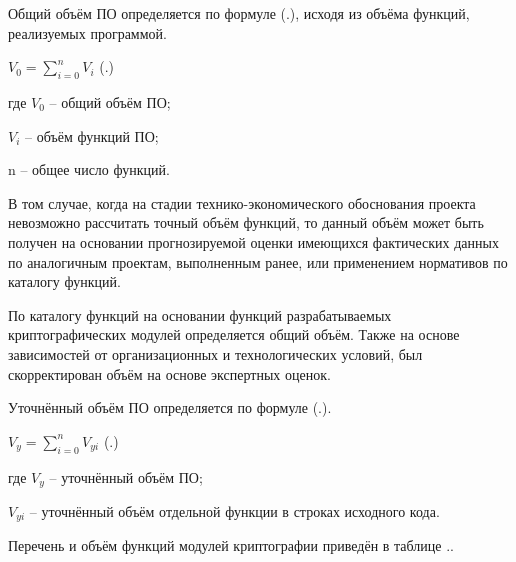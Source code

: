 \subtitlespace

{\gostFont
	
	\par \redline Общий объём ПО определяется по формуле (\thechaptercntr .\theformulacntr), исходя из объёма функций, реализуемых программой. 
	
	\formulaspace \par \redline 
	$V_0=\sum_{i=0}^{n}V_i$ 
	\hfill (\thechaptercntr .\theformulacntr) \redline
	\formulaspace \addtocounter{formulacntr}{1}

	\par \redline где $V_0$ {--} общий объём ПО;
	\par \redline \wherespace $V_i$ {--} объём функций ПО;
	\par \redline \wherespace n {--} общее число функций.
	
	\par \redline В том случае, когда на стадии технико-экономического обоснования проекта невозможно рассчитать точный объём функций, то данный объём может быть получен на основании прогнозируемой оценки имеющихся фактических данных по аналогичным проектам, выполненным ранее, или применением нормативов по каталогу функций.
	
	\par \redline По каталогу функций на основании функций разрабатываемых криптографических модулей определяется общий объём. Также на основе зависимостей от организационных и технологических условий, был скорректирован объём на основе экспертных оценок.
	
	\par \redline Уточнённый объём ПО определяется по формуле (\thechaptercntr .\theformulacntr).
	
	\formulaspace \par \redline 
	$V_y=\sum_{i=0}^{n}V_{yi}$ 
	\hfill (\thechaptercntr .\theformulacntr) \redline
	\formulaspace \addtocounter{formulacntr}{1}
	
	\par \redline где $V_y$ {--} уточнённый объём ПО;
	\par \redline \wherespace $V_{yi}$ {--} уточнённый объём отдельной функции в строках исходного кода.
	
	\par \redline Перечень и объём функций модулей криптографии приведён в таблице \thechaptercntr .\thetablecntr .

	\par \redline

}
